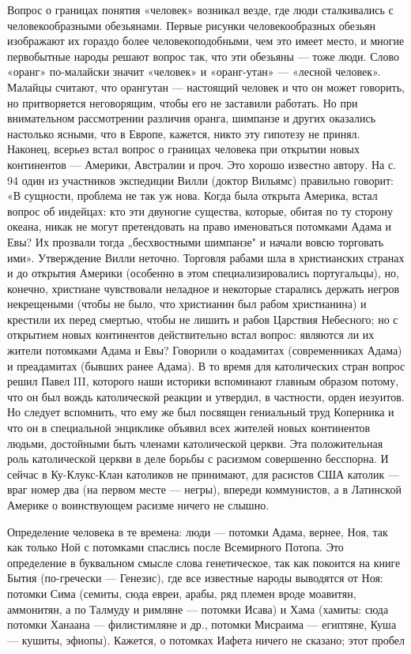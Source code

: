 Вопрос   о   границах   понятия    «человек»   возникал   везде,   где
люди    сталкивались    с   человекообразными    обезьянами.    Первые
рисунки   человекообразных  обезьян   изображают   их  гораздо   более
человекоподобными, чем  это имеет  место, и многие  первобытные народы
решают  вопрос так,  что эти  обезьяны  --- тоже  люди. Слово  «оранг»
по-малайски  значит «человек»  и  «оранг-утан»  --- «лесной  человек».
Малайцы  считают,  что  орангутан  ---  настоящий  человек  и  что  он
может говорить,  но притворяется  неговорящим, чтобы его  не заставили
работать. Но при внимательном рассмотрении различия оранга, шимпанзе и
других оказались  настолько ясными, что  в Европе, кажется,  никто эту
гипотезу не принял. Наконец, всерьез  встал вопрос о границах человека
при  открытии новых  континентов ---  Америки, Австралии  и проч.  Это
хорошо известно автору.  На с. 94 один из  участников экспедиции Вилли
(доктор Вильямс)  правильно говорит: «В  сущности, проблема не  так уж
нова. Когда  была открыта Америка,  встал вопрос об индейцах:  кто эти
двуногие  существа, которые,  обитая по  ту сторону  океана, никак  не
могут  претендовать на  право именоваться  потомками Адама  и Евы?  Их
прозвали  тогда  „бесхвостными  шимпанзе"  и  начали  вовсю  торговать
ими». Утверждение  Вилли неточно.  Торговля рабами шла  в христианских
странах  и до  открытия  Америки (особенно  в этом  специализировались
португальцы), но, конечно, христиане  чувствовали неладное и некоторые
старались держать  негров некрещеными  (чтобы не было,  что христианин
был  рабом  христианина)  и  крестили   их  перед  смертью,  чтобы  не
лишить и  рабов Царствия Небесного;  но с открытием  новых континентов
действительно встал  вопрос: являются ли  их жители потомками  Адама и
Евы? Говорили о коадамитах (современниках Адама) и преадамитах (бывших
ранее Адама).  В то  время для католических  стран вопрос  решил Павел
III,  которого наши  историки вспоминают  главным образом  потому, что
он  был вождь  католической  реакции и  утвердил,  в частности,  орден
иезуитов. Но  следует вспомнить,  что ему  же был  посвящен гениальный
труд Коперника и  что он в специальной энциклике  объявил всех жителей
новых континентов людьми, достойными быть членами католической церкви.
Эта положительная  роль католической церкви  в деле борьбы  с расизмом
совершенно бесспорна. И сейчас в Ку-Клукс-Клан католиков не принимают,
для  расистов США  католик ---  враг номер  два (на  первом месте  ---
негры),  впереди коммунистов,  а  в Латинской  Америке о  воинствующем
расизме ничего не слышно.

Определение человека  в те  времена: люди  --- потомки  Адама, вернее,
Ноя, так как только Ной  с потомками спаслись после Всемирного Потопа.
Это  определение  в  буквальном  смысле слова  генетическое,  так  как
покоится на книге  Бытия (по-гречески --- Генезис),  где все известные
народы выводятся от Ноя: потомки  Сима (семиты, сюда евреи, арабы, ряд
племен вроде моавитян,  аммонитян, а по Талмуду и  римляне --- потомки
Исава) и  Хама (хамиты: сюда  потомки Ханаана --- филистимляне  и др.,
потомки Мисраима  --- египтяне, Куша  --- кушиты, эфиопы).  Кажется, о
потомках Иафета ничего не сказано; этот пробел
